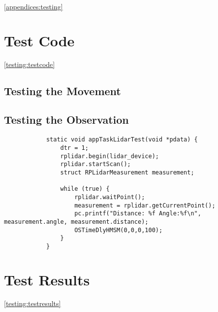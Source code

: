 	\ref{appendices:testing}
		\section{Test Code}
		\ref{testing:testcode}
			\subsection{Testing the Movement}
			\subsection{Testing the Observation}
			\label{testcode:observation1}
			\begin{lstlisting}
			static void appTaskLidarTest(void *pdata) {
				dtr = 1;
				rplidar.begin(lidar_device);
				rplidar.startScan();
				struct RPLidarMeasurement measurement;
				
				while (true) {
					rplidar.waitPoint();
					measurement = rplidar.getCurrentPoint();
					pc.printf("Distance: %f Angle:%f\n", measurement.angle, measurement.distance);
					OSTimeDlyHMSM(0,0,0,100);
				}
			}
				\end{lstlisting}
				
				
		\section{Test Results}
		\ref{testing:testresults}
		
